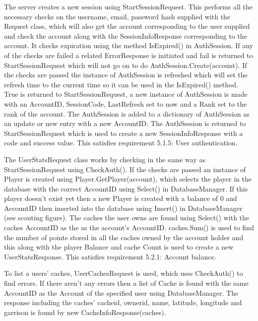 The server creates a new session using StartSessionRequest. This performs all the necessary checks on the username, email, password hash supplied with the Request class, which will also get the account corresponding to the user supplied and check the account along with the SessionInfoResponse corresponding to the account. It checks expiration using the method IsExpired() in AuthSession. If any of the checks are failed a related ErrorResponse is initiated and fail is returned to StartSessionRequest which will not go on to do AuthSession.Create(account). If the checks are passed the instance of AuthSession is refreshed which will set the refresh time to the current time so it can be used in the IsExpired() method. True is returned to StartSessionRequest, a new instance of AuthSession is made with an AccountID, SessionCode, LastRefresh set to now and a Rank set to the rank of the account. The AuthSession is added to a dictionary of AuthSession as an update or new entry with a new AccountID. The AuthSession is returned to StartSessionRequest which is used to create a new SessionInfoResponse with a code and success value. This satisfies requirement 5.1.5: User authentication.

The UserStatsRequest class works by checking in the same way as StartSessionRequest using CheckAuth(). If the checks are passed an instance of Player is created using Player.GetPlayer(account), which selects the player in the database with the correct AccountID using Select() in DatabaseManager. If this player doesn't exist yet then a new Player is created with a balance of 0 and AccountID then inserted into the database using Insert() in DatabaseManager (see scouting figure). The caches the user owns are found using Select() with the caches AccountID as the as the account's AccountID. caches.Sum() is used to find the number of points stored in all the caches owned by the account holder and this along with the player Balance and cache Count is used to create a new UserStatsResponse. This satisfies requirement 5.2.1: Account balance.

To list a users' caches, UserCachesRequest is used, which uses CheckAuth() to find errors. If there aren't any errors then a list of Cache is found with the same AccountID as the Account of the specified user using DatabaseManager. The response including the caches' cacheid, ownerid, name, latitude, longitude and garrison is found by new CacheInfoResponse(caches).

